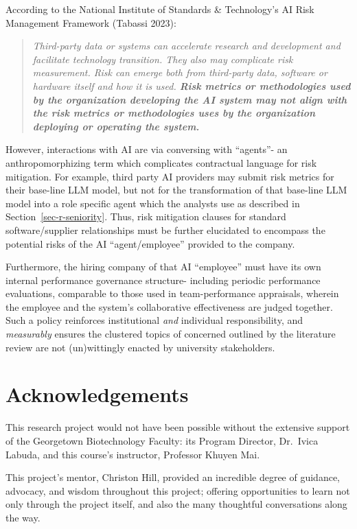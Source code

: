 \documentclass[
]{article}
\begin{document}
According to the National Institute of Standards \& Technology's AI Risk
Management Framework (Tabassi 2023):

\begin{quote}
\emph{Third-party data or systems can accelerate research and
development and facilitate technology transition. They also may
complicate risk measurement. Risk can emerge both from third-party data,
software or hardware itself and how it is used. \textbf{Risk metrics or
methodologies used by the organization developing the AI system may not
align with the risk metrics or methodologies uses by the organization
deploying or operating the system.}}
\end{quote}

However, interactions with AI are via conversing with ``agents''- an
anthropomorphizing term which complicates contractual language for risk
mitigation. For example, third party AI providers may submit risk
metrics for their base-line LLM model, but not for the transformation of
that base-line LLM model into a role specific agent which the analysts
use as described in Section~\ref{sec-r-seniority}. Thus, risk mitigation
clauses for standard software/supplier relationships must be further
elucidated to encompass the potential risks of the AI ``agent/employee''
provided to the company.

Furthermore, the hiring company of that AI ``employee'' must have its
own internal performance governance structure- including periodic
performance evaluations, comparable to those used in team-performance
appraisals, wherein the employee and the system's collaborative
effectiveness are judged together. Such a policy reinforces
institutional \emph{and} individual responsibility, and
\emph{measurably} ensures the clustered topics of concerned outlined by
the literature review are not (un)wittingly enacted by university
stakeholders.

\section{Acknowledgements}\label{acknowledgements}

This research project would not have been possible without the extensive
support of the Georgetown Biotechnology Faculty: its Program Director,
Dr.~Ivica Labuda, and this course's instructor, Professor Khuyen Mai.

This project's mentor, Christon Hill, provided an incredible degree of
guidance, advocacy, and wisdom throughout this project; offering
opportunities to learn not only through the project itself, and also the
many thoughtful conversations along the way.
\end{document}
